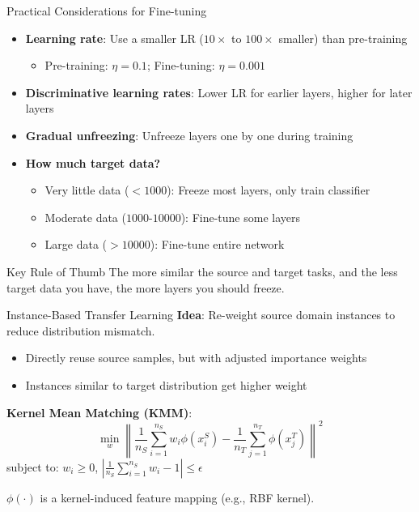 \documentclass[11pt]{beamer}
\begin{document}
\begin{frame}{Practical Considerations for Fine-tuning}
    \begin{itemize}
        \item \textbf{Learning rate}: Use a smaller LR ($10\times$ to $100\times$ smaller) than pre-training
            \begin{itemize}
                \item Pre-training: $\eta = 0.1$; Fine-tuning: $\eta = 0.001$
            \end{itemize}
        \item \textbf{Discriminative learning rates}: Lower LR for earlier layers, higher for later layers
        \item \textbf{Gradual unfreezing}: Unfreeze layers one by one during training
        \item \textbf{How much target data?}
            \begin{itemize}
                \item Very little data ($<1000$): Freeze most layers, only train classifier
                \item Moderate data ($1000$-$10000$): Fine-tune some layers
                \item Large data ($>10000$): Fine-tune entire network
            \end{itemize}
    \end{itemize}
    \vfill
    \begin{alertblock}{Key Rule of Thumb}
        The more similar the source and target tasks, and the less target data you have, the more layers you should freeze.
    \end{alertblock}
\end{frame}

\begin{frame}{Instance-Based Transfer Learning}
    \textbf{Idea}: Re-weight source domain instances to reduce distribution mismatch.
    \begin{itemize}
        \item Directly reuse source samples, but with adjusted importance weights
        \item Instances similar to target distribution get higher weight
    \end{itemize}
    \vspace{0.5em}
    \textbf{Kernel Mean Matching (KMM)}:
    \[
        \min_{w} \left\| \frac{1}{n_S} \sum_{i=1}^{n_S} w_i \phi(x_i^S) - \frac{1}{n_T} \sum_{j=1}^{n_T} \phi(x_j^T) \right\|^2
    \]
    subject to: $w_i \geq 0$, $\left|\frac{1}{n_S}\sum_{i=1}^{n_S} w_i - 1\right| \leq \epsilon$

    \vspace{0.3em}
    $\phi(\cdot)$ is a kernel-induced feature mapping (e.g., RBF kernel).
\end{frame}
\end{document}
